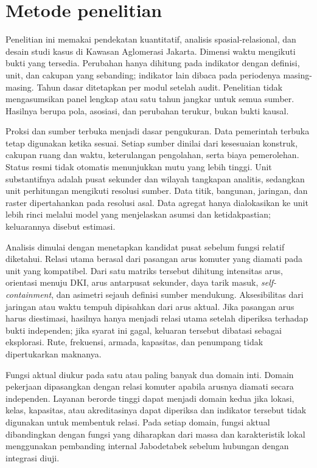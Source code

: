 \documentclass[11pt,a4paper,oneside,openany,indonesian]{report}
\begin{document}
\section{Metode penelitian}

Penelitian ini memakai pendekatan kuantitatif, analisis spasial-relasional, dan desain studi kasus di Kawasan Aglomerasi Jakarta. Dimensi waktu mengikuti bukti yang tersedia. Perubahan hanya dihitung pada indikator dengan definisi, unit, dan cakupan yang sebanding; indikator lain dibaca pada periodenya masing-masing. Tahun dasar ditetapkan per modul setelah audit. Penelitian tidak mengasumsikan panel lengkap atau satu tahun jangkar untuk semua sumber. Hasilnya berupa pola, asosiasi, dan perubahan terukur, bukan bukti kausal.

Proksi dan sumber terbuka menjadi dasar pengukuran. Data pemerintah terbuka tetap digunakan ketika sesuai. Setiap sumber dinilai dari kesesuaian konstruk, cakupan ruang dan waktu, keterulangan pengolahan, serta biaya pemerolehan. Status resmi tidak otomatis menunjukkan mutu yang lebih tinggi. Unit substantifnya adalah pusat sekunder dan wilayah tangkapan analitis, sedangkan unit perhitungan mengikuti resolusi sumber. Data titik, bangunan, jaringan, dan raster dipertahankan pada resolusi asal. Data agregat hanya dialokasikan ke unit lebih rinci melalui model yang menjelaskan asumsi dan ketidakpastian; keluarannya disebut estimasi.

Analisis dimulai dengan menetapkan kandidat pusat sebelum fungsi relatif diketahui. Relasi utama berasal dari pasangan arus komuter yang diamati pada unit yang kompatibel. Dari satu matriks tersebut dihitung intensitas arus, orientasi menuju DKI, arus antarpusat sekunder, daya tarik masuk, \emph{self-containment}, dan asimetri sejauh definisi sumber mendukung. Aksesibilitas dari jaringan atau waktu tempuh dipisahkan dari arus aktual. Jika pasangan arus harus diestimasi, hasilnya hanya menjadi relasi utama setelah diperiksa terhadap bukti independen; jika syarat ini gagal, keluaran tersebut dibatasi sebagai eksplorasi. Rute, frekuensi, armada, kapasitas, dan penumpang tidak dipertukarkan maknanya.

Fungsi aktual diukur pada satu atau paling banyak dua domain inti. Domain pekerjaan dipasangkan dengan relasi komuter apabila arusnya diamati secara independen. Layanan berorde tinggi dapat menjadi domain kedua jika lokasi, kelas, kapasitas, atau akreditasinya dapat diperiksa dan indikator tersebut tidak digunakan untuk membentuk relasi. Pada setiap domain, fungsi aktual dibandingkan dengan fungsi yang diharapkan dari massa dan karakteristik lokal menggunakan pembanding internal Jabodetabek sebelum hubungan dengan integrasi diuji.
\end{document}
